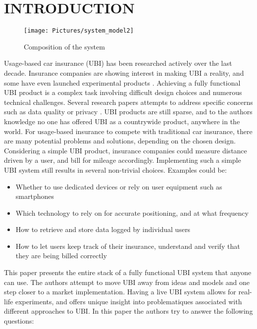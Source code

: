 \section{INTRODUCTION}\label{sec:intro}
\begin{figure}[t]
\centering
\texttt{[image: Pictures/system\_model2]}
\caption{Composition of the system}
\label{fig:system_model}
\end{figure}

Usage-based car insurance (UBI) has been researched actively over the last decade. Insurance companies are showing interest in making UBI a reality, and some have even launched experimental products \citep{allstate_ubi} \citep{progressive_ubi} \citep{qbe_ubi}. Achieving a fully functional UBI product is a complex task involving difficult design choices and numerous technical challenges. Several research papers attempts to address specific concerns such as data quality \citep{art:insurtelematics} or privacy \citep{art:pripayd}. UBI products are still sparse, and to the authors knowledge no one has offered UBI as a countrywide product, anywhere in the world.
For usage-based insurance to compete with traditional car insurance, there are many potential problems and solutions, depending on the chosen design. Considering a simple UBI product, insurance companies could measure distance driven by a user, and bill for mileage accordingly. Implementing such a simple UBI system still results in several non-trivial choices. Examples could be:

\begin{itemize}
\item Whether to use dedicated devices or rely on user equipment such as smartphones
\item Which technology to rely on for accurate positioning, and at what frequency
\item How to retrieve and store data logged by individual users
\item How to let users keep track of their insurance, understand and verify that they are being billed correctly
\end{itemize}

This paper presents the entire stack of a fully functional UBI system that anyone can use. The authors attempt to move UBI away from ideas and models and one step closer to a market implementation. Having a live UBI system allows for real-life experiments, and offers unique insight into problematiques associated with different approaches to UBI. In this paper the authors try to answer the following questions:


